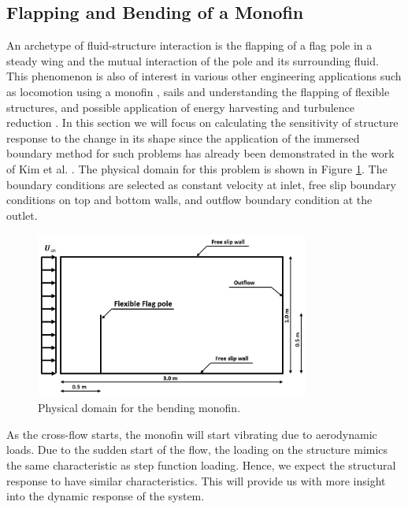 \subsection{Flapping and Bending of a Monofin}
An archetype of fluid-structure interaction is the flapping of a flag pole in a steady wing and the mutual interaction of the pole and its surrounding fluid. This phenomenon is also of interest in various other engineering applications such as locomotion using a monofin \cite{luersen2006computationally}, sails and understanding the flapping of flexible structures, and possible application of energy harvesting \cite{allen2001energy} and turbulence reduction \cite{shen2003turbulent}. In this section we will focus on calculating the sensitivity of structure response to the change in its shape since the application of the immersed boundary method for such problems has already been demonstrated in the work of Kim et al. \cite{kim2007penalty}. The physical domain for this problem is shown in Figure \ref{fig:C5_flagPolePhysical}. The boundary conditions are selected as constant velocity at inlet, free slip boundary conditions on top and bottom walls, and outflow boundary condition at the outlet.
%
\begin{figure}[H]
    \centering
    \includegraphics[width=9.00cm]{Chapter_5/figure/flagPole_domain_shape.jpg}
    \caption{Physical domain for the bending monofin.}
    \label{fig:C5_flagPolePhysical}
\end{figure}
%
As the cross-flow starts, the monofin will start vibrating due to aerodynamic loads. Due to the sudden start of the flow, the loading on the structure mimics the same characteristic as step function loading. Hence, we expect the structural response to have similar characteristics. This will provide us with more insight into the dynamic response of the system. 

